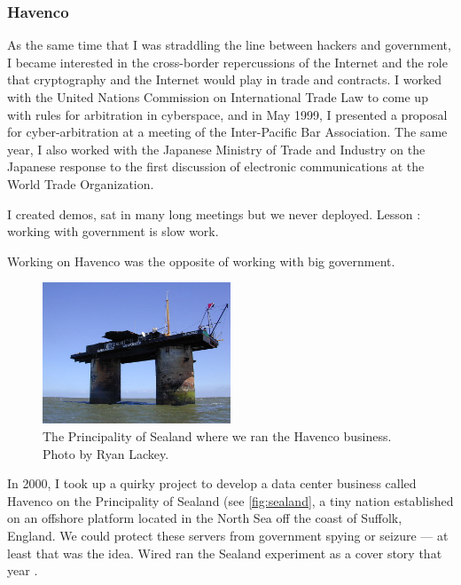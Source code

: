 \subsubsection{Havenco}
\label{sec:havenco}

As the same time that I was straddling the line between hackers and government, I became interested in the cross-border repercussions of the Internet and the role that cryptography and the Internet would play in trade and contracts. I worked with the United Nations Commission on International Trade Law to come up with rules for arbitration in cyberspace, and in May 1999, I presented a proposal for cyber-arbitration at a meeting of the Inter-Pacific Bar Association. The same year, I also worked with the Japanese Ministry of Trade and Industry on the Japanese response to the first discussion of electronic communications at the World Trade Organization. 

I created demos, sat in many long meetings but we never deployed. Lesson : working with government is slow work.

Working on Havenco was the opposite of working with big government.

\begin{figure}[h]
 \centering
 \includegraphics[width=0.5\textwidth]{pictures/sealand}
 \caption{The Principality of Sealand where we ran the Havenco business. Photo by Ryan Lackey.}
 \label{fig:sealand}
\end{figure}

In 2000, I took up a quirky project to develop a data center business called Havenco on the Principality of Sealand (see \autoref{fig:sealand}, a tiny nation established on an offshore platform located in the North Sea off the coast of Suffolk, England. We could protect these servers from government spying or seizure --- at least that was the idea. Wired ran the Sealand experiment as a cover story that year \cite{garfinkel2000welcome}.

